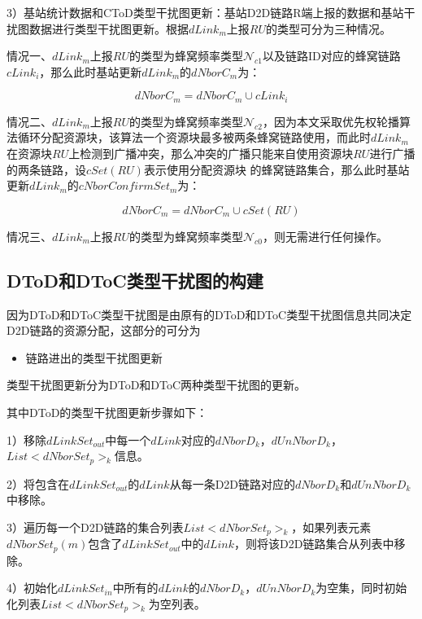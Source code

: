 \documentclass[figurelist,tablelist,algorithmlist,nomlist,masters]{seuthesix}
\begin{document}
	3）基站统计数据和CToD类型干扰图更新：基站D2D链路R端上报的数据和基站干扰图数据进行类型干扰图更新。根据$dLink_m$上报$RU$的类型可分为三种情况。
	
	情况一、$dLink_m$上报$RU$的类型为蜂窝频率类型$\mathcal{N}_{c1}$以及链路ID对应的蜂窝链路$cLink_i$，那么此时基站更新$dLink_m$的$dNborC_m$为：
	
	\begin{equation}\label{eq2.1}
	dNborC_m = dNborC_m \cup cLink_i
	\end{equation}
	
	情况二、$dLink_m$上报$RU$的类型为蜂窝频率类型$\mathcal{N}_{c2}$，因为本文采取优先权轮播算法循环分配资源块，该算法一个资源块最多被两条蜂窝链路使用，而此时$dLink_m$在资源块$RU$上检测到广播冲突，那么冲突的广播只能来自使用资源块$RU$进行广播的两条链路，设$cSet(RU)$表示使用分配资源块 的蜂窝链路集合，那么此时基站更新$dLink_m$的$cNborConfirmSe{t_m}$为：
	
	\begin{equation}\label{eq2.2}
	dNborC_m = dNborC_m \cup cSet(RU)
	\end{equation}
	
	情况三、$dLink_m$上报$RU$的类型为蜂窝频率类型$\mathcal{N}_{c0}$，则无需进行任何操作。
	
	
	\subsection{DToD和DToC类型干扰图的构建}
	因为DToD和DToC类型干扰图是由原有的DToD和DToC类型干扰图信息共同决定D2D链路的资源分配，这部分的可分为
	
	\begin{itemize}
		\item 链路进出的类型干扰图更新
	\end{itemize}
	
	类型干扰图更新分为DToD和DToC两种类型干扰图的更新。
	
	其中DToD的类型干扰图更新步骤如下：
	
	1）移除$dLinkSet_{out}$中每一个$dLink$对应的$dNborD_k$，$dUnNborD_k$，$List < dNborSet_{p}{ > _k}$信息。
	
	2）将包含在$dLinkSet_{out}$的$dLink$从每一条D2D链路对应的$dNborD_k$和$dUnNborD_k$中移除。
	
	3）遍历每一个D2D链路的集合列表$List < dNborSet_{p}{ > _k}$，如果列表元素$dNborSet_{p}(m)$包含了$dLinkSet_{out}$中的$dLink$，则将该D2D链路集合从列表中移除。
	
	4）初始化$dLinkSet_{in}$中所有的$dLink$的$dNborD_k$，$dUnNborD_k$为空集，同时初始化列表$List < dNborSet_{p}{ > _k}$为空列表。
	
\end{document}
